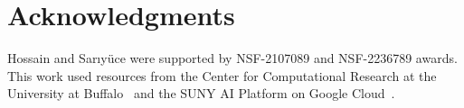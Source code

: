 \documentclass[sigconf]{acmart}
\begin{document}
\section*{Acknowledgments}

Hossain and Sarıyüce were supported by NSF-2107089 and NSF-2236789 awards. This work used resources from the Center for Computational Research at the University at Buffalo~\cite{ccr} and the SUNY AI Platform on Google Cloud~\cite{sunyai}.







%
%

\appendix



\end{document}
